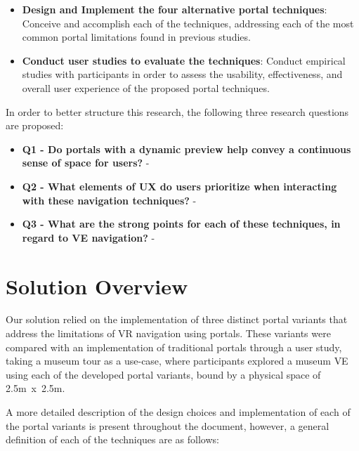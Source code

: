 \begin{itemize}
    \item \textbf{Design and Implement the four alternative portal techniques}:
    Conceive and accomplish each of the techniques, addressing each of the most common portal limitations found in previous studies.

    \item \textbf{Conduct user studies to evaluate the techniques}: 
    Conduct empirical studies with participants in order to assess the usability, effectiveness, and overall user experience of the proposed portal techniques.
    
\end{itemize}

In order to better structure this research, the following three research questions are proposed:

\begin{itemize}
    \item \textbf{Q1 - Do portals with a dynamic preview help convey a continuous sense of space for users?} - 
    
    \item \textbf{Q2 - What elements of \gls{UX} do users prioritize when interacting with these navigation techniques?} - 
    
    \item \textbf{Q3 - What are the strong points for each of these techniques, in regard to \gls{VE} navigation?} - 
    
\end{itemize}

\section{Solution Overview}
\label{sec:solution-overview}

Our solution relied on the implementation of three distinct portal variants that address the limitations of \gls{VR} navigation using portals. 
These variants were compared with an implementation of traditional portals through a user study, taking a museum tour as a use-case, 
where participants explored a museum \gls{VE} using each of the developed portal variants, bound by a physical space of 2.5m~x~2.5m.

A more detailed description of the design choices and implementation of each of the portal variants is present throughout the document, however, a general 
definition of each of the techniques are as follows:

